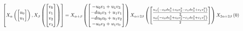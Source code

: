 \documentclass[11pt]{article}
\theoremstyle{definition}
\begin{document}
\[
\scaletoalign{\textwidth}{\left[ X_{\alpha}\left(\left[\begin{matrix}u_{0}\\u_{1}\end{matrix}\right]\right), X_{\beta}\left(\left[\begin{matrix}v_{0}\\v_{1}\\v_{2}\\v_{3}\end{matrix}\right]\right) \right] = X_{\alpha + \beta}\left(\left[\begin{matrix}- u_{0} v_{1} + u_{1} v_{3}\\- d u_{0} v_{3} + u_{1} v_{1}\\- d u_{0} v_{0} + u_{1} v_{2}\\- u_{0} v_{2} + u_{1} v_{0}\end{matrix}\right]\right) X_{\alpha + 2\beta}\left(\left[\begin{matrix}\frac{u_{1} \left(- c_{0} d v_{0}^{2} + c_{0} v_{2}^{2} - c_{1} d v_{3}^{2} + c_{1} v_{1}^{2}\right)}{2}\\\frac{u_{0} \left(- c_{0} d v_{0}^{2} + c_{0} v_{2}^{2} - c_{1} d v_{3}^{2} + c_{1} v_{1}^{2}\right)}{2}\end{matrix}\right]\right) X_{2\alpha + 2\beta}\left(0\right)}
\]
\end{document}
